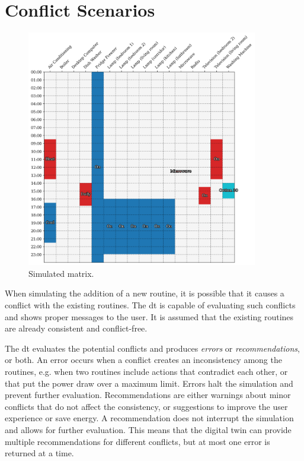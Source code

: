 \section{Conflict Scenarios}

\begin{figure}
    \centering
    \includegraphics[width=0.9\textwidth]{images/simulated_matrix.png}
    \caption{Simulated matrix.}
    \label{fig:simulated_consumption_matrix}
\end{figure}

When simulating the addition of a new routine, it is possible that it causes a conflict with the existing routines. The \acrshort{dt} is capable of evaluating such conflicts and shows proper messages to the user. It is assumed that the existing routines are already consistent and conflict-free.

The \acrshort{dt} evaluates the potential conflicts and produces \textit{errors} or \textit{recommendations}, or both. An error occurs when a conflict creates an inconsistency among the routines, e.g. when two routines include actions that contradict each other, or that put the power draw over a maximum limit. Errors halt the simulation and prevent further evaluation. Recommendations are either warnings about minor conflicts that do not affect the consistency, or suggestions to improve the user experience or save energy. A recommendation does not interrupt the simulation and allows for further evaluation. This means that the digital twin can provide multiple recommendations for different conflicts, but at most one error is returned at a time.

